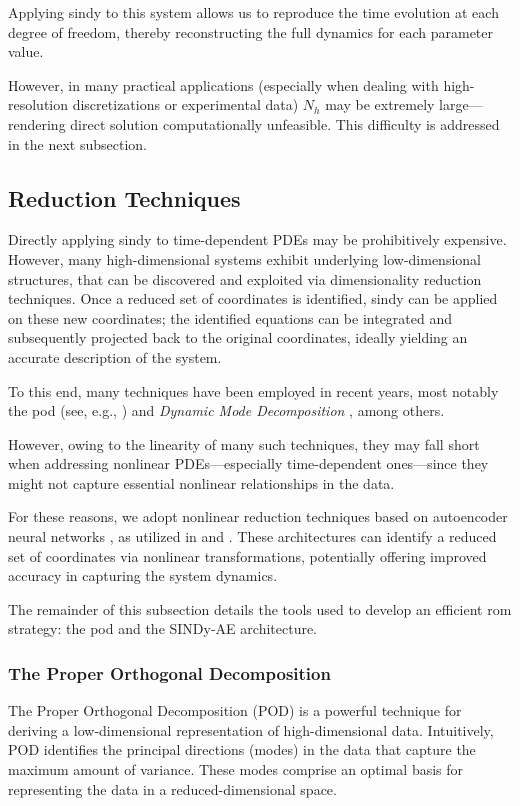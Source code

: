 \documentclass[reqno]{amsart}[standalone]
\theoremstyle{definition}
\theoremstyle{remark}
\begin{document}
Applying \gls{sindy} to this system allows us to reproduce the time evolution at each degree of freedom, thereby reconstructing the full dynamics for each parameter value.

However, in many practical applications (especially when dealing with high-resolution discretizations or experimental data) $N_h$ may be extremely large—rendering direct solution computationally unfeasible. This difficulty is addressed in the next subsection.

\subsection{Reduction Techniques}
Directly applying \gls{sindy} to time-dependent PDEs may be prohibitively expensive. However, many high-dimensional systems exhibit underlying low-dimensional structures, that can be discovered and exploited via dimensionality reduction techniques. Once a reduced set of coordinates is identified, \gls{sindy} can be applied on these new coordinates; the identified equations can be integrated and subsequently projected back to the original coordinates, ideally yielding an accurate description of the system.

To this end, many techniques have been employed in recent years, most notably the \gls{pod} (see, e.g., \parencite{Quarteroni_2017}) and \textit{Dynamic Mode Decomposition} \parencite{Jonathan_2024}, among others.

However, owing to the linearity of many such techniques, they may fall short when addressing nonlinear PDEs—especially time-dependent ones—since they might not capture essential nonlinear relationships in the data.

For these reasons, we adopt nonlinear reduction techniques based on autoencoder neural networks \parencite{Goodfellow_2016}, as utilized in \parencite{Champion_2019} and \parencite{Conti_2023}. These architectures can identify a reduced set of coordinates via nonlinear transformations, potentially offering improved accuracy in capturing the system dynamics.

The remainder of this subsection details the tools used to develop an efficient \gls{rom} strategy: the \gls{pod} and the SINDy-AE architecture.

\subsubsection{The Proper Orthogonal Decomposition}\label{subsubsec:POD}
The Proper Orthogonal Decomposition (POD) is a powerful technique for deriving a low-dimensional representation of high-dimensional data. Intuitively, POD identifies the principal directions (modes) in the data that capture the maximum amount of variance. These modes comprise an optimal basis for representing the data in a reduced-dimensional space.
\end{document}
